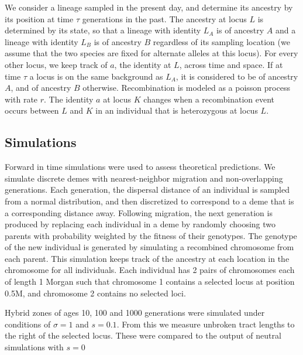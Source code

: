 \documentclass[12pt]{article}
\begin{document}
We consider a lineage sampled in the present day, and determine its ancestry by its position at time $\tau$ generations in the past. The ancestry at locus $L$ is determined by its state, so that a lineage with identity $L_A$ is of ancestry $A$ and a lineage with identity $L_B$ is of ancestry $B$ regardless of its sampling location (we assume that the two species are fixed for alternate alleles at this locus). For every other locus, we keep track of $a$, the identity at $L$, across time and space. If at time $\tau$ a locus is on the same background as $L_A$, it is considered to be of ancestry $A$, and of ancestry $B$ otherwise. Recombination is modeled as a poisson process with rate $r$. The identity $a$ at locus $K$ changes when a recombination event occurs between $L$ and $K$ in an individual that is heterozygous at locus $L$. 
\\




\subsection{Simulations}
Forward in time simulations were used to assess theoretical predictions. We simulate discrete demes with nearest-neighbor migration and non-overlapping generations. Each generation, the dispersal distance of an individual is sampled from a normal distribution, and then discretized to correspond to a deme that is a corresponding distance away. Following migration, the next generation is produced by replacing each individual in a deme by randomly choosing two parents with probability weighted by the fitness of their genotypes. The genotype of the new individual is generated by simulating a recombined chromosome from each parent. This simulation keeps track of the ancestry at each location in the chromosome for all individuals. Each individual has 2 pairs of chromosomes each of length 1 Morgan such that chromosome 1 contains a selected locus at position 0.5M, and chromosome 2 contains no selected loci.

Hybrid zones of ages 10, 100 and 1000 generations were simulated under conditions of $\sigma=1$ and $s=0.1$. From this we measure unbroken tract lengths to the right of the selected locus. These were compared to the output of neutral simulations with $s=0$\\
\end{document}
